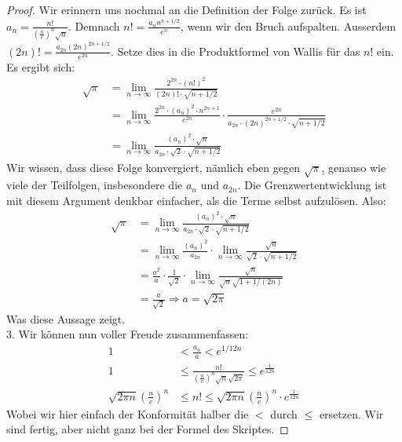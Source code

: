\documentclass[10pt,fleqn]{article}
\theoremstyle{definition}
\theoremstyle{remark}
\begin{document}
\begin{proof}
    Wir erinnern uns nochmal an die Definition der Folge zurück. Es ist \(a_n = \frac{n!}{\left(\frac{n}{e}\right)^n \sqrt{n}}\). Demnach \(n! = \frac{a_n n^{n+1/2}}{e^n}\), wenn wir den Bruch aufspalten. Ausserdem \((2n)! = \frac{a_{2n} (2n)^{2n+1/2}}{e^{2n}}\). Setze dies in die Produktformel von Wallis für das \(n!\) ein. Es ergibt sich:
    \begin{align*}
        \sqrt{\pi} &= \lim_{n\to\infty} \frac{2^{2n}\cdot(n!)^2}{(2n)!\cdot\sqrt{n+1/2}}\\
        &= \lim_{n\to\infty} \frac{2^{2n}\cdot(a_n)^2\cdot n^{2n+1}}{e^{2n}} \cdot \frac{e^{2n}}{a_{2n}\cdot(2n)^{2n+1/2} \cdot \sqrt{n+1/2}}\\
        &= \lim_{n\to\infty} \frac{(a_n)^2\cdot\sqrt{n}}{a_{2n} \cdot \sqrt{2} \cdot \sqrt{n+1/2}}
    \end{align*}
    Wir wissen, dass diese Folge konvergiert, nämlich eben gegen \(\sqrt{\pi}\), genauso wie viele der Teilfolgen, insbesondere die \(a_n\) und \(a_{2n}\). Die Grenzwertentwicklung ist mit diesem Argument denkbar einfacher, als die Terme selbst aufzulösen. Also:
    \begin{align*}
        \sqrt{\pi} &= \lim_{n\to\infty} \frac{(a_n)^2\cdot\sqrt{n}}{a_{2n} \cdot \sqrt{2} \cdot \sqrt{n+1/2}}\\
        &= \lim_{n\to\infty} \frac{(a_n)^2}{a_{2n}} \cdot \lim_{n\to\infty} \frac{\sqrt{n}}{\sqrt{2} \cdot \sqrt{n+1/2}}\\
        &= \frac{a^2}{a} \cdot \frac{1}{\sqrt{2}} \cdot \lim_{n\to\infty}\frac{\sqrt{n}}{\sqrt{n}\sqrt{1+1/(2n)}}\\
        &= \frac{a}{\sqrt{2}} \Rightarrow a = \sqrt{2\pi}
    \end{align*}
    Was diese Aussage zeigt.\\
    
    3. Wir können nun voller Freude zusammenfassen:
    \begin{align*}
        1 &< \frac{a_n}{a} < e^{1/12n}\\
        1 &\leq \frac{n!}{\left(\frac{n}{e}\right)^n\sqrt{n}\sqrt{2\pi}} \leq e^{\frac{1}{12n}}\\
        \sqrt{2 \pi n}\left(\frac{n}{e}\right)^n &\leq n! \leq \sqrt{2 \pi n}\left(\frac{n}{e}\right)^n \cdot e^{\frac{1}{12n}}
    \end{align*}
    Wobei wir hier einfach der Konformität halber die \(<\) durch \(\leq\) ersetzen. Wir sind fertig, aber nicht ganz bei der Formel des Skriptes.


\end{proof}
\end{document}
